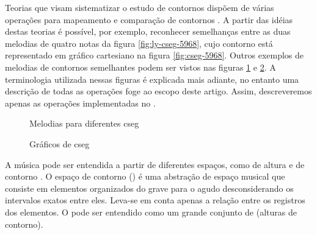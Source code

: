 Teorias que visam sistematizar o estudo de contornos dispõem de várias
operações para mapeamento e comparação de contornos
\cite{friedmann85:methodology,friedmann87:response,morris87:composition,morris93:directions,marvin.ea87:relating,clifford95:contour,polansky.ea92:possible,quinn97:fuzzy,beard03:contour}. A
partir das idéias destas teorias é possível, por exemplo, reconhecer
semelhanças entre as duas melodias de quatro notas da figura
\ref{fig:ly-cseg-5968}, cujo contorno está representado em gráfico
cartesiano na figura \ref{fig:cseg-5968}. Outros exemplos de melodias
de contornos semelhantes podem ser vistos nas figuras
\ref{fig:melodias-cseg} e \ref{fig:graficos-cseg}. A terminologia
utilizada nessas figuras é explicada mais adiante, no entanto uma
descrição de todas as operações foge ao escopo deste artigo. Assim,
descreveremos apenas as operações implementadas no \goiaba.

\begin{figure}
  \centering
  \caption{Melodias para diferentes cseg}
  \label{fig:melodias-cseg}
\end{figure}

\begin{figure}
  \centering
  \caption{Gráficos de cseg}
  \label{fig:graficos-cseg}
\end{figure}

A música pode ser entendida a partir de diferentes espaços, como de
altura e de contorno \cite{morris87:composition}. O espaço de contorno
() é uma abstração de espaço musical que consiste em
elementos organizados do grave para o agudo desconsiderando os
intervalos exatos entre eles. Leva-se em conta apenas a relação entre
os registros dos elementos. O  pode ser entendido como
um grande conjunto de  (alturas de contorno).  

